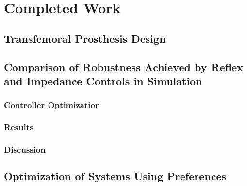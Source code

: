\chapter{Completed Work}\label{sec:completed_work}

\section{Transfemoral Prosthesis Design}\label{sec:completed_design}

\section{Comparison of Robustness Achieved by Reflex and Impedance Controls in
    Simulation}\label{sec:completed_comparison}

\subsection{Controller Optimization}\label{sec:completed_comparison_opt}

\subsection{Results}\label{sec:completed_comparison_results}

\subsection{Discussion}\label{sec:completed_comparison_discuss}

\section{Optimization of Systems Using
    Preferences}\label{sec:completed_pref_opt}
